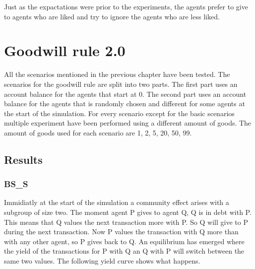 \documentclass[twoside,openright]{uva-bachelor-thesis}
\begin{document}
Just as the expactations were prior to the experiments, the agents prefer to give to agents who are liked and try to ignore the agents who are less liked.









\section{Goodwill rule 2.0}
All the scenarios mentioned in the previous chapter have been tested. The scenarios for the goodwill rule are split into two parts. The first part uses an account balance for the agents that start at 0. The second part uses an account balance for the agents that is randomly chosen and different for some agents at the start of the simulation. For every scenario except for the basic scenarios multiple experiment have been performed using a different amount of goods. The amount of goods used for each scenario are 1, 2, 5, 20, 50, 99.
\subsection{Results}

\subsubsection{BS\_S}
Immidiatly at the start of the simulation a community effect arises with a subgroup of size two. The moment agent P gives to agent Q, Q is in debt with P. This means that Q values the next transaction more with P. So Q will give to P during the next transaction. Now P values the transaction with Q more than with any other agent, so P gives back to Q. An equilibrium has emerged where the yield of the transactions for P with Q an Q with P will switch between the same two values. The following yield curve shows what happens. 
\end{document}
